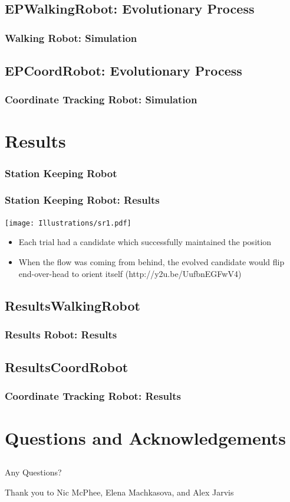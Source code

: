 \documentclass{beamer}
\begin{document}
\subsection{EPWalkingRobot: Evolutionary Process}
\begin{frame}
  \frametitle{Walking Robot: Simulation}
\end{frame}

\subsection{EPCoordRobot: Evolutionary Process}
\begin{frame}
  \frametitle{Coordinate Tracking Robot: Simulation}
\end{frame}

\section{Results}
\subsubsection{Station Keeping Robot} %
\begin{frame}
  \frametitle{Station Keeping Robot: Results}
  \begin{center}


  \texttt{[image: Illustrations/sr1.pdf]}
       \\
    \end{center}
  \begin{itemize}
    \item Each trial had a candidate which successfully maintained the position
        \item When the flow was coming from behind, the evolved candidate would flip end-over-head to orient itself (http://y2u.be/UufbnEGFwV4)
  \end{itemize}
\end{frame}

\subsection{ResultsWalkingRobot}
\begin{frame}
  \frametitle{Results Robot: Results}
\end{frame}

\subsection{ResultsCoordRobot}
\begin{frame}
  \frametitle{Coordinate Tracking Robot: Results}
\end{frame}

\section{Questions and Acknowledgements}
\subsection{}
\begin{frame}
  \frametitle{}
  Any Questions?

Thank you to Nic McPhee, Elena Machkasova, and Alex Jarvis
\end{frame}
\end{document}
